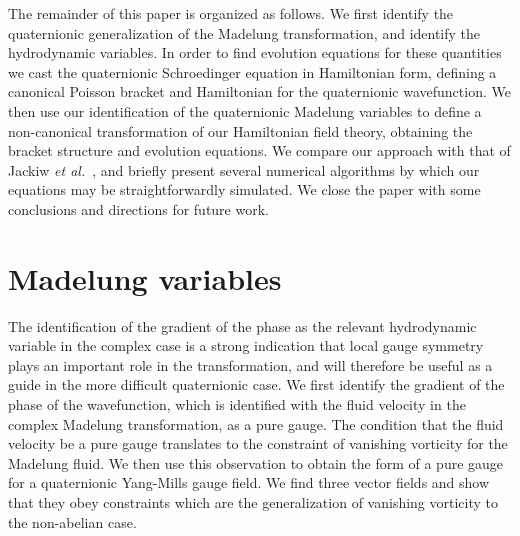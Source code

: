\documentclass[a4paper,aps,prd,preprint,groupedaddress]{revtex4}
\begin{document}
The remainder of this paper is organized as follows. We first identify the quaternionic generalization of the Madelung transformation, and identify the hydrodynamic variables.  In order to find evolution equations for these quantities we cast the quaternionic Schroedinger equation in Hamiltonian form, defining a canonical Poisson bracket and Hamiltonian for the quaternionic wavefunction. We then use our identification of the quaternionic Madelung  variables to define a non-canonical transformation of our Hamiltonian field theory, obtaining the bracket structure and evolution equations. We compare our approach with that of Jackiw {\it et al.}~\cite{bib:jackiw1,bib:jackiw2, bib:jackiw3}, and briefly present several numerical algorithms by which our equations may be straightforwardly simulated. We close the paper with some conclusions and directions for future work.

\section{Madelung variables}

The identification of the gradient of the phase as the relevant hydrodynamic variable in the complex case is a strong indication that  local gauge symmetry plays an important role in the transformation, and will therefore be useful as a guide in the more difficult quaternionic case.  We first identify the gradient of the phase of the wavefunction, which is identified with the fluid velocity in the complex Madelung transformation, as a pure \coordHE{} gauge. The condition that the fluid velocity be a pure gauge translates to the constraint of vanishing vorticity for the Madelung fluid. We then use this observation to obtain the form of a pure gauge for a quaternionic \coordHE{} Yang-Mills gauge field. We find three vector fields and show that they obey constraints which are the generalization of vanishing vorticity to the non-abelian case.
\end{document}
